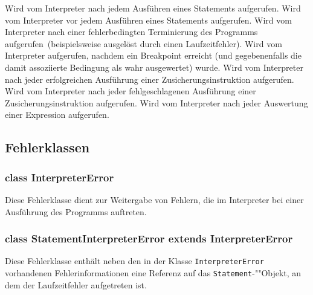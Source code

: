 \begin{description}
    Wird vom Interpreter nach jedem Ausführen eines Statements aufgerufen.
    Wird vom Interpreter vor jedem Ausführen eines Statements aufgerufen.
    Wird vom Interpreter nach einer fehlerbedingten Terminierung des Programms aufgerufen~(beispielsweise ausgelöst durch einen Laufzeitfehler).
    Wird vom Interpreter aufgerufen, nachdem ein Breakpoint erreicht (und gegebenenfalls die damit assoziierte Bedingung als wahr ausgewertet) wurde.
    Wird vom Interpreter nach jeder erfolgreichen Ausführung einer Zusicherungsinstruktion aufgerufen.
    Wird vom Interpreter nach jeder fehlgeschlagenen Ausführung einer Zusicherungsinstruktion aufgerufen.
    Wird vom Interpreter nach jeder Auswertung einer Expression aufgerufen.
\end{description}

\subsection{Fehlerklassen}
\subsubsection{class InterpreterError}
Diese Fehlerklasse dient zur Weitergabe von Fehlern, die im Interpreter bei einer Ausführung des Programms auftreten.

\subsubsection{class StatementInterpreterError extends InterpreterError}
Diese Fehlerklasse enthält neben den in der Klasse \texttt{InterpreterError} vorhandenen Fehlerinformationen eine Referenz auf das \texttt{Statement}-""Objekt, an dem der Laufzeitfehler aufgetreten ist.

